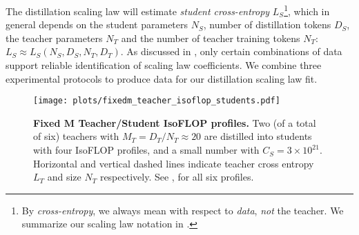 The distillation scaling law will estimate \emph{student cross-entropy} $L_S$\footnote{By \emph{cross-entropy}, we always mean with respect to \emph{data}, \emph{not} the teacher.
We summarize our scaling law notation in .}, which in general depends on the student parameters $N_S$, number of distillation tokens $D_S$, the teacher parameters $N_T$ and the number of teacher training tokens $N_T$: $L_S\approx L_S(N_S,D_S,N_T,D_T)$.
As discussed in ,
only certain combinations of data support reliable identification of scaling law coefficients.
We combine three experimental protocols to produce data for our distillation scaling law fit.

\begin{figure}[h]
	\centering
	\texttt{[image: plots/fixedm\_teacher\_isoflop\_students.pdf]}
    \vspace{-0.2cm}
	\caption{\textbf{Fixed $\bm M$ Teacher/Student IsoFLOP profiles.}
    Two (of a total of six) teachers with $M_T=D_T/N_T\approx 20$ %
    are distilled into students with four IsoFLOP profiles, and a small number with $C_S=3\times 10^{21}$.
    Horizontal and vertical dashed lines indicate teacher cross entropy $L_T$ and size $N_T$ respectively.
    See ,  for all six profiles.
	}\vspace{-0.15cm}
	\label{fig:fixedm-teacher-isoflop-students}
\end{figure}

